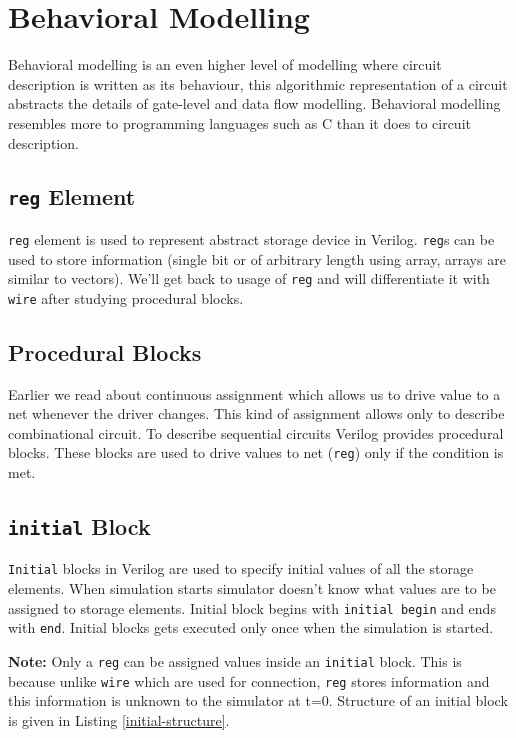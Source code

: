 \documentclass[a4paper,10pt]{article}
\theoremstyle{mytheor}
\begin{document}
\section{Behavioral Modelling}
Behavioral modelling is an even higher level of modelling where
circuit description is written as its behaviour, this algorithmic
representation of a circuit abstracts the details of gate-level and
data flow modelling. Behavioral modelling resembles more to
programming languages such as C than it does to circuit description.


\subsection{\lstinline[style=verilog-inline-style]{reg} Element}
\lstinline[style=verilog-inline-style]{reg} element is used to
represent abstract storage device in
Verilog. \lstinline[style=verilog-inline-style]{reg}s can be used to
store information (single bit or of arbitrary length using
array, arrays are similar to vectors). We'll get back to usage of
\lstinline[style=verilog-inline-style]{reg} and will differentiate it
with \lstinline[style=verilog-inline-style]{wire} after studying
procedural blocks.

\subsection{Procedural Blocks}
Earlier we read about continuous assignment which allows us to drive
value to a net whenever the driver changes. This kind of assignment
allows only to describe combinational circuit. To describe sequential
circuits Verilog provides procedural blocks. These blocks are used to
drive values to net (\lstinline[style=verilog-inline-style]{reg}) only
if the condition is met.

\subsection{\lstinline[style=verilog-inline-style]{initial} Block}
\lstinline[style=verilog-inline-style]{Initial} blocks in Verilog are
used to specify initial values of all the storage elements. When
simulation starts simulator doesn't know what values are to be
assigned to storage elements. Initial block begins with
\lstinline[style=verilog-inline-style]{initial begin} and ends with
\lstinline[style=verilog-inline-style]{end}. Initial blocks gets
executed only once when the simulation is started.

{\color{red}\textbf{Note:}} Only a
\lstinline[style=verilog-inline-style]{reg} can be assigned values
inside an \lstinline[style=verilog-inline-style]{initial} block. This
is because unlike \lstinline[style=verilog-inline-style]{wire} which
are used for connection, \lstinline[style=verilog-inline-style]{reg}
stores information and this information is unknown to the simulator at
t=0. Structure of an initial block is given in Listing \ref{initial-structure}.
\end{document}
